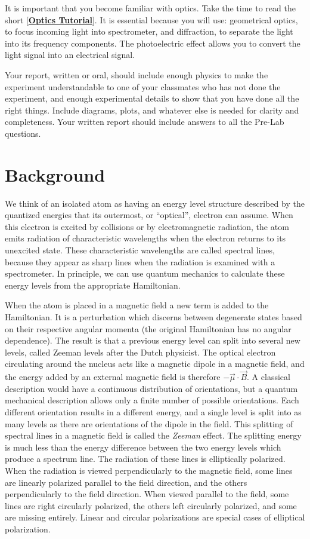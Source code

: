 \documentclass{../lab}
\begin{document}
It is important that you become familiar with optics. Take the time to read the short [\href{http://experimentationlab.berkeley.edu/OpticsTutorial}{\textbf{Optics Tutorial}}]. It is essential because you will use: geometrical optics, to focus incoming light into spectrometer, and diffraction, to separate the light into its frequency components. The photoelectric effect allows you to convert the light signal into an electrical signal.

Your report, written or oral, should include enough physics to make the experiment understandable to one of your classmates who has not done the experiment, and enough experimental details to show that you have done all the right things. Include diagrams, plots, and whatever else is needed for clarity and completeness. Your written report should include answers to all the Pre-Lab questions.

\section{Background}

We think of an isolated atom as having an energy level structure described by the quantized energies that its outermost, or ``optical'', electron can assume. When this electron is excited by collisions or by electromagnetic radiation, the atom emits radiation of characteristic wavelengths when the electron returns to its unexcited state. These characteristic wavelengths are called spectral lines, because they appear as sharp lines when the radiation is examined with a spectrometer. In principle, we can use quantum mechanics to calculate these energy levels from the appropriate Hamiltonian.

When the atom is placed in a magnetic field a new term is added to the Hamiltonian. It is a perturbation which discerns between degenerate states based on their respective angular momenta (the original Hamiltonian has no angular dependence). The result is that a previous energy level can split into several new levels, called Zeeman levels after the Dutch physicist. The optical electron circulating around the nucleus acts like a magnetic dipole in a magnetic field, and the energy added by an external magnetic field is therefore $-\vec \mu \cdot\vec B$. A classical description would have a continuous distribution of orientations, but a quantum mechanical description allows only a finite number of possible orientations. Each different orientation results in a different energy, and a single level is split into as many levels as there are orientations of the dipole in the field. This splitting of spectral lines in a magnetic field is called the \emph{Zeeman} effect. The splitting energy is much less than the energy difference between the two energy levels which produce a spectrum line. The radiation of these lines is elliptically polarized. When the radiation is viewed perpendicularly to the magnetic field, some lines are linearly polarized parallel to the field direction, and the others perpendicularly to the field direction. When viewed parallel to the field, some lines are right circularly polarized, the others left circularly polarized, and some are missing entirely. Linear and circular polarizations are special cases of elliptical polarization.
\end{document}
